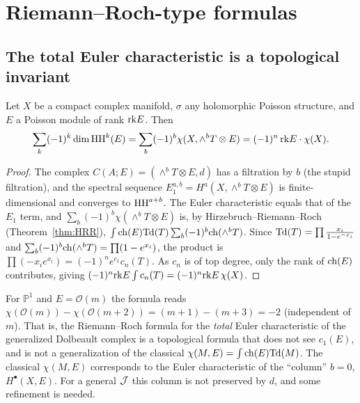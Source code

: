\section{Riemann--Roch-type formulas}\label{sec:RR}
\subsection{The total Euler characteristic is a topological invariant}
\begin{prop}\tP\label{prop:euler}
Let $X$ be a compact complex manifold, $\sigma$ any holomorphic Poisson structure, and $E$ a Poisson module of rank $\mathrm{rk} E$. Then
\[\sum_k(-1)^k\dim\mathrm{HH}^k(E)=\sum_b(-1)^b\chi(X,\wedge^bT\otimes E)=(-1)^n\,\mathrm{rk} E\cdot\chi(X).\]
\end{prop}
\begin{proof}
The complex $C(A;E)=(\wedge^bT\otimes E,d)$ has a filtration by $b$ (the stupid filtration), and the spectral sequence $E_1^{a,b}=H^a(X,\wedge^bT\otimes E)$ is finite-dimensional and converges to $\mathrm{HH}^{a+b}$. The Euler characteristic equals that of the $E_1$ term, and $\sum_b(-1)^b\chi(\wedge^bT\otimes E)$ is, by Hirzebruch--Riemann--Roch (Theorem~\ref{thm:HRR}),
$\int\mathrm{ch}(E)\mathrm{Td}(T)\sum_b(-1)^b\mathrm{ch}(\wedge^bT)$. Since $\mathrm{Td}(T)=\prod\frac{x_i}{1-e^{-x_i}}$ and $\sum_b(-1)^b\mathrm{ch}(\wedge^bT)=\prod(1-e^{x_i})$, the product is $\prod(-x_ie^{x_i})=(-1)^ne^{c_1}c_n(T)$. As $c_n$ is of top degree, only the rank of $\mathrm{ch}(E)$ contributes, giving $(-1)^n\mathrm{rk} E\int c_n(T)=(-1)^n\mathrm{rk} E\,\chi(X)$.\qedhere
\end{proof}
\begin{rem}[\tP\ Meaning]
For $\mathbb{P}^1$ and $E=\mathcal O(m)$ the formula reads $\chi(\mathcal O(m))-\chi(\mathcal O(m+2))=(m+1)-(m+3)=-2$ (independent of $m$). That is, the Riemann--Roch formula for the \emph{total} Euler characteristic of the generalized Dolbeault complex is a topological formula that does not see $c_1(E)$, and is not a generalization of the classical $\chi(M,E)=\int\mathrm{ch}(E)\mathrm{Td}(M)$. The classical $\chi(M,E)$ corresponds to the Euler characteristic of the ``column'' $b=0$, $H^\bullet(X,E)$. For a general $\mathcal J$ this column is not preserved by $d$, and some refinement is needed.
\end{rem}

